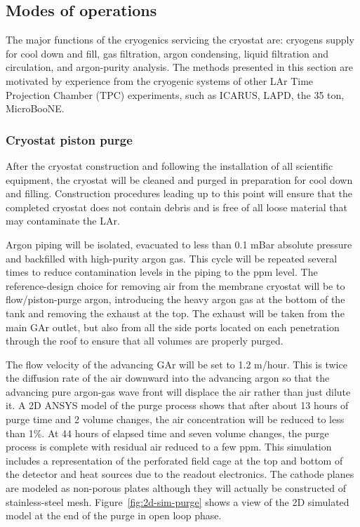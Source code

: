 \subsection{Modes of operations}
\label{sec:cryo-op-modes}

The major functions of the cryogenics servicing the cryostat are: cryogens supply for cool down and fill, gas filtration, argon condensing, liquid filtration and circulation, and argon-purity analysis. The methods presented in this section are motivated by experience from the cryogenic systems of other LAr Time Projection Chamber (TPC) experiments, such as ICARUS, LAPD, the 35 ton, MicroBooNE.

\subsubsection{Cryostat piston purge}

After the cryostat construction and following the installation of all scientific equipment, the cryostat will be cleaned and purged in preparation for cool down and filling. Construction procedures leading up to this point will ensure that the completed cryostat does not contain debris and is free of all loose material that may contaminate the LAr.


Argon piping will be isolated, evacuated to less than 0.1 mBar  absolute pressure and backfilled with high-purity argon gas. This cycle will be repeated several times to reduce contamination levels in the piping to the ppm level. The reference-design choice for removing air from the membrane cryostat will be to flow/piston-purge argon, introducing the heavy argon gas at the bottom of the tank and removing the exhaust at the top. The exhaust will be taken from the main GAr outlet, but also from all the side ports located on each penetration through the roof to ensure that all volumes are properly purged.

The flow velocity of the advancing GAr will be set to 1.2 m/hour. This is twice the diffusion rate of the air downward into the advancing argon so that the advancing pure argon-gas wave front will displace the air rather than just dilute it. A 2D ANSYS model of the purge process shows that after about 13 hours of purge time and 2 volume changes, the air concentration will be reduced to less than 1\%. At 44 hours of elapsed time and seven volume changes, the purge process is complete with residual air reduced to a few ppm. This simulation includes a representation of the perforated field cage at the top and bottom of the detector and heat sources due to the readout electronics. The cathode planes are modeled as non-porous plates although they will actually be constructed of stainless-steel mesh. Figure~\ref{fig:2d-sim-purge} shows a view of the 2D simulated model at the end of the purge in open loop phase.

